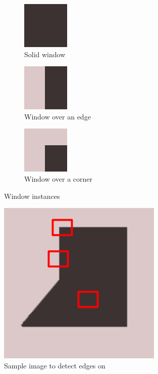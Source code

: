 \documentclass[11pt]{article}
\begin{document}
\begin{figure}[h]
	\centering
	\begin{subfigure}[t]{.3\textwidth}
		\centering
		\includegraphics[scale=1]{pics/moravec1.png}
		\caption{Solid window}
		\label{moravecsolid}
	\end{subfigure}
	\hfill
	\begin{subfigure}[t]{.3\textwidth}
		\centering
		\includegraphics[scale=1]{pics/moravec2.png}
		\caption{Window over an edge}
		\label{moravecedge}
	\end{subfigure}
	\hfill
	\begin{subfigure}[t]{.3\textwidth}
		\centering
		\includegraphics[scale=1]{pics/moravec3.png}
		\caption{Window over a corner}
		\label{moraveccorner}
	\end{subfigure}
	\caption{Window instances}
	\label{moravecinstances}
\end{figure}

\begin{figure}[h]
	\centering
	\includegraphics[scale=0.6]{pics/moravec.png}
	\caption{Sample image to detect edges on}
	\label{moravec}
\end{figure}
\end{document}
